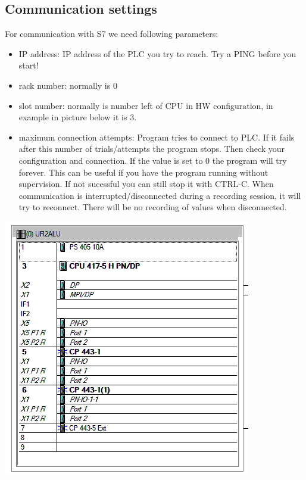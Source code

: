 \documentclass[a4paper,10pt,english]{sphinxmanual}
\begin{document}
\subsection{Communication settings}
\label{configuration:communication-settings}
For communication with S7 we need following parameters:
\begin{itemize}
\item {} 
IP address: IP address of the PLC you try to reach. Try a PING before you start!

\item {} 
rack number: normally is 0

\item {} 
slot number: normally is number left of CPU in HW configuration, in example in picture below it is 3.

\item {} 
maximum connection attempts: Program tries to connect to PLC. If it fails after this number of trials/attempts the program stops. Then check your configuration and connection. If the value is set to 0 the program will try forever. This can be useful if you have the program running without supervision. If not sucessful you can still stop it with CTRL-C. When communication is interrupted/disconnected during a recording session, it will try to reconnect. There will be no recording of values when disconnected.

\end{itemize}

{\hfill\includegraphics{hwconfig.png}\hfill}
\end{document}
